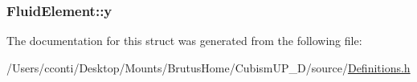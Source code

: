\subsubsection[{y}]{ Fluid\+Element\+::y}\label{struct_fluid_element_ab6b28ead806a67353f8658e8fa2cbd7d}


The documentation for this struct was generated from the following file\+:\begin{DoxyCompactItemize}
\item 
/\+Users/cconti/\+Desktop/\+Mounts/\+Brutus\+Home/\+Cubism\+U\+P\+\_\+D/source/\hyperlink{_definitions_8h}{Definitions.\+h}\end{DoxyCompactItemize}
